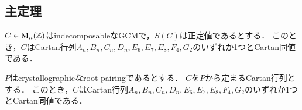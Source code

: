 \subsection{主定理}

\begin{theorem}
  \label{thm:classification_cartan}
  \uses{}
  $C \in \operatorname{M}_n(\mathbb{Z})$はindecomposableなGCMで，$S(C)$は正定値であるとする．
  このとき，$C$はCartan行列$A_n, B_n, C_n, D_n, E_6, E_7, E_8, F_4, G_2$のいずれか1つとCartan同値である．
\end{theorem}

\begin{theorem}
  \label{thm:classification_root}
  \leanok
  \uses{}
  $P$はcrystallographicなroot pairingであるとする．
  $C$を$P$から定まるCartan行列とする．
  このとき，$C$はCartan行列$A_n, B_n, C_n, D_n, E_6, E_7, E_8, F_4, G_2$のいずれか1つとCartan同値である．
\end{theorem}